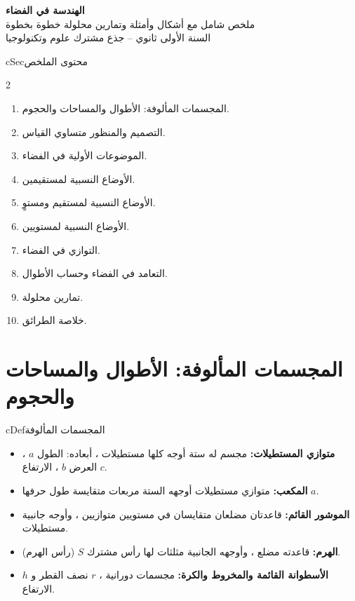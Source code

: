\documentclass[12pt,a4paper]{article}
\newenvironment{BOX}[2]{\begin{otherlanguage}{english}\begin{arbox}{#1}{#2}}{\end{arbox}\end{otherlanguage}}
\newenvironment{tarif}[1][تعريف]{\begin{BOX}{cDef}{#1}}{\end{BOX}}
\newenvironment{LTR}{\begin{otherlanguage}{english}}{\end{otherlanguage}}
\begin{document}
\begin{LTR}
\begin{tcolorbox}[enhanced,colback=cSec!10,colframe=cSec!40,arc=3mm,halign=center,boxrule=0.6pt,top=12pt,bottom=12pt,before upper={\selectlanguage{arabic}}]
{\color{cSec}\fontsize{28}{34}\selectfont\bfseries الهندسة في الفضاء}\\[8pt]
{\color{cSec!80!black}\large ملخص شامل مع أشكال وأمثلة وتمارين محلولة خطوة بخطوة}\\[5pt]
{\color{cSec!80!black}\large السنة الأولى ثانوي -- جذع مشترك علوم وتكنولوجيا}
\end{tcolorbox}
\end{LTR}

\begin{BOX}{cSec}{محتوى الملخص}
\begin{multicols}{2}
\begin{enumerate}[label=\textbf{\arabic*.}]
\item المجسمات المألوفة: الأطوال والمساحات والحجوم.
\item التصميم والمنظور متساوي القياس.
\item الموضوعات الأولية في الفضاء.
\item الأوضاع النسبية لمستقيمين.
\item الأوضاع النسبية لمستقيم ومستوٍ.
\item الأوضاع النسبية لمستويين.
\item التوازي في الفضاء.
\item التعامد في الفضاء وحساب الأطوال.
\item تمارين محلولة.
\item خلاصة الطرائق.
\end{enumerate}
\end{multicols}
\end{BOX}

\section{المجسمات المألوفة: الأطوال والمساحات والحجوم}
\begin{tarif}[المجسمات المألوفة]
\begin{itemize}
\item \textbf{متوازي المستطيلات:} مجسم له ستة أوجه كلها مستطيلات ، أبعاده: الطول $a$ ، العرض $b$ ، الارتفاع $c$.
\item \textbf{المكعب:} متوازي مستطيلات أوجهه الستة مربعات متقايسة طول حرفها $a$.
\item \textbf{الموشور القائم:} قاعدتان مضلعان متقايسان في مستويين متوازيين ، وأوجه جانبية مستطيلات.
\item \textbf{الهرم:} قاعدته مضلع ، وأوجهه الجانبية مثلثات لها رأس مشترك $S$ (رأس الهرم).
\item \textbf{الأسطوانة القائمة والمخروط والكرة:} مجسمات دورانية ، $r$ نصف القطر و $h$ الارتفاع.
\end{itemize}
\end{tarif}
\end{document}
